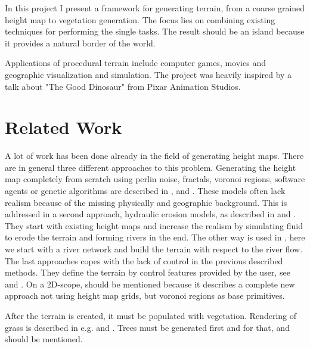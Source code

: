 \documentclass[journal, letterpaper]{IEEEtran}
\begin{document}
In this project I present a framework for generating terrain, from a coarse grained height map to vegetation generation. The focus lies on combining existing techniques for performing the single tasks.
The result should be an island because it provides a natural border of the world.

Applications of procedural terrain include computer games, movies and geographic visualization and simulation.
The project was heavily inspired by a talk about "The Good Dinosaur" from Pixar Animation Studios.

\section{Related Work}
A lot of work has been done already in the field of generating height maps. There are in general three different approaches to this problem.
Generating the height map completely from scratch using perlin noise, fractals, voronoi regions, software agents or genetic algorithms are described in \cite{Doran.2010}, \cite{JacobOlsen.2004} and \cite{TeongJooOngRyanSaundersJohnKeyserJohnJ.Leggett.2005}. These models often lack realism because of the missing physically and geographic background. This is addressed in a second approach, hydraulic erosion models, as described in \cite{BedrichBenes.2007} and \cite{Mei.}. They start with existing height maps and increase the realism by simulating fluid to erode the terrain and forming rivers in the end. The other way is used in \cite{JeanDavidGenevauxEricGalinEricGuerinAdrienPeytavieBedrichBenes.2013}, here we start with a river network and build the terrain with respect to the river flow.
The last approaches copes with the lack of control in the previous described methods. They define the terrain by control features provided by the user, see \cite{FloraPonjouTasseArnaudEmilienMariePauleCaniStefanieHahmannAdrienBernhardt.2014} and \cite{Hnaidi.2010}.
On a 2D-scope, \cite{AmitPatel.2010} should be mentioned because it describes a complete new approach not using height map grids, but voronoi regions as base primitives.

After the terrain is created, it must be populated with vegetation. Rendering of grass is described in e.g. \cite{KurtPelzer.} and \cite{Boulanger.2005}. Trees must be generated first and for that, \cite{AdamRunionsBrendanLanePrzemyslawPrusinkiewicz.2007} and \cite{Weber.} should be mentioned.
\end{document}
